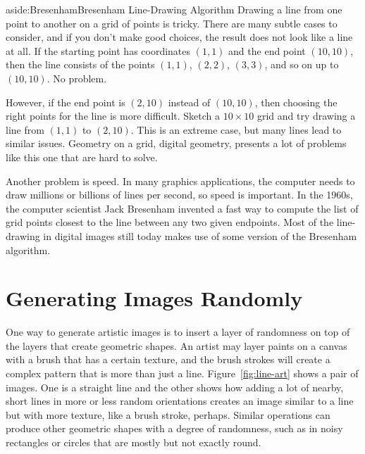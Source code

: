 \begin{aside}{aside:Bresenham}{Bresenham Line-Drawing Algorithm}
Drawing a line from one point to another on a grid of points is tricky.
There are many subtle cases to consider, and
if you don't make good choices, the result does not look
like a line at all. If the starting point has
coordinates $(1,1)$ and the end point $(10,10)$,
then the line consists of the points $(1,1)$,
$(2,2)$, $(3,3)$, and so on up to $(10,10)$.
No problem.

However, if the end point is $(2,10)$ instead of $(10,10)$,
then choosing the right points for the line is more difficult.
Sketch a $10\times10$ grid and try drawing a line
from  $(1,1)$ to  $(2,10)$.
This is an extreme case, but many lines lead to similar issues.
Geometry on a grid,
digital geometry,
presents a lot of problems like this one that are hard to solve.

Another problem is speed. In many graphics applications, the
computer needs to draw millions or billions of lines per second,
so speed is important.
In the 1960s, the computer scientist
Jack Bresenham invented
a fast way to compute the list of grid points closest to the line
between any two given endpoints.
Most of the line-drawing in digital images still today
makes use of some version of the Bresenham algorithm.
\end{aside}

\section{Generating Images Randomly}

One way to generate artistic images is to insert a layer of
randomness on top of the layers that create geometric shapes.
An artist may layer paints on a canvas
with a brush that has a certain texture, and the brush strokes
will create a complex pattern that is more than just a line.
Figure~\ref{fig:line-art} shows a pair of images.
One is a straight line
and the other shows how adding a lot of nearby, short lines in
more or less random orientations
creates an image similar to a line but with more texture,
like a brush stroke, perhaps.
Similar operations can produce
other geometric shapes with a degree of randomness,
such as in noisy rectangles or circles that are
mostly but not exactly round.


